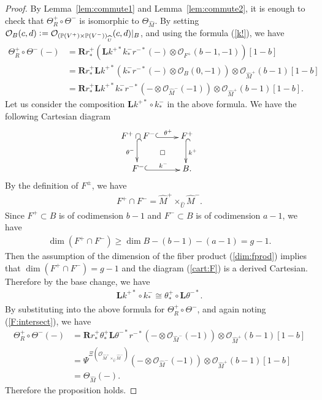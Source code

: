\documentclass[11pt]{amsart}
\theoremstyle{plain}
\newcommand{\oO}{\mathcal{O}}
\newcommand{\dR}{\mathbf{R}}
\newcommand{\dL}{\mathbf{L}}
\begin{document}
\begin{proof}
By Lemma~\ref{lem:commute1} and Lemma~\ref{lem:commute2}, 
it is enough to check that 
$\Theta_R^{+} \circ \Theta^-$
is isomorphic to $\Theta_{\widehat{M}}$. 
By setting $\oO_B(c, d) 
\cneq \oO_{(\mathbb{P}(V^+) \times \mathbb{P}(V^-))_{\widehat{U}}}
(c, d)|_{B}$, 
and using the formula (\ref{k!}), 
we have 
\begin{align*}
\Theta_R^+ \circ \Theta^-(-) &=
\dR r^+_{\ast} \left(\dL k^{+\ast}k^{-}_{\ast}r^{-\ast}(-) \otimes 
\oO_{F^+}(b-1, -1) \right)[1-b] \\
&=\dR r^+_{\ast} \dL k^{+\ast}\left(k^{-}_{\ast}r^{-\ast}(-) \otimes 
\oO_{B}(0, -1) \right)\otimes \oO_{\widehat{M}^+}(b-1)[1-b] \\
&=\dR r^+_{\ast} \dL k^{+\ast}k^{-}_{\ast} r^{-\ast}\left(- \otimes
\oO_{\widehat{M}^-}(-1)\right) \otimes \oO_{\widehat{M}^+}(b-1)[1-b].
\end{align*}
Let us consider the 
composition $\dL k^{+\ast} \circ k_{\ast}^-$ in the above formula. 
We have the following Cartesian 
diagram
\begin{align}\label{cart:F}
\xymatrix{
F^+ \cap F^- \ar@<-0.3ex>@{^{(}->}[r]^-{\theta^+} \ar@<-0.3ex>@{^{(}->}[d]_-{\theta^-} \ar@{}[dr]|\square & F^+  \ar@<-0.3ex>@{^{(}->}[d]^-{k^+} \\
F^-  \ar@<-0.3ex>@{^{(}->}[r]^-{k^-} & B.
}
\end{align}
By the definition of $F^{\pm}$, we have 
\begin{align}\label{F:intersect}
F^+ \cap F^- =\widehat{M}^{+} \times_{\widehat{U}} \widehat{M}^{-}.
\end{align}
Since $F^+ \subset B$ is of codimension 
$b-1$ and $F^- \subset B$ is of codimension 
$a-1$, we have 
\begin{align*}
\dim (F^+ \cap F^-) \ge \dim B-(b-1)-(a-1)=g-1. 
\end{align*}
Then the assumption of the dimension of the fiber product (\ref{dim:fprod})
implies that 
$\dim (F^+ \cap F^-)=g-1$ and 
the diagram (\ref{cart:F}) is a derived Cartesian. 
Therefore by the base change, we have 
\begin{align*}
\dL k^{+\ast} \circ k_{\ast}^- \cong \theta^{+}_{\ast} 
\circ \dL \theta^{-\ast}. 
\end{align*}
By substituting into the above formula for 
$\Theta_R^+ \circ \Theta^-$, and again noting 
(\ref{F:intersect}),  
we have
\begin{align*}
\Theta_R^+ \circ \Theta^-(-)
&=\dR r^+_{\ast} \theta^{+}_{\ast}
\dL \theta^{-\ast}
r^{-\ast}\left(- \otimes
\oO_{\widehat{M}^-}(-1)\right) \otimes \oO_{\widehat{M}^+}(b-1)[1-b] \\
&=\Psi^{\Xi(\oO_{\widehat{M}^{+} \times_{\widehat{U}} \widehat{M}^{-}})}
\left(- \otimes
\oO_{\widehat{M}^-}(-1)\right)\otimes \oO_{\widehat{M}^+}(b-1)[1-b] \\
&=\Theta_{\widehat{M}}(-).
\end{align*}
Therefore the proposition holds. 
\end{proof}
\end{document}
